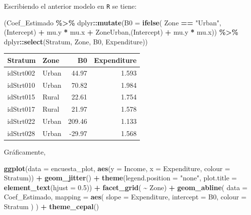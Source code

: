 \documentclass[
  spanish,
  12pt,
]{book}
\newenvironment{Shaded}{\begin{snugshade}}{\end{snugshade}}
\newcommand{\AttributeTok}[1]{\textcolor[rgb]{0.13,0.29,0.53}{#1}}
\newcommand{\FloatTok}[1]{\textcolor[rgb]{0.00,0.00,0.81}{#1}}
\newcommand{\FunctionTok}[1]{\textcolor[rgb]{0.13,0.29,0.53}{\textbf{#1}}}
\newcommand{\NormalTok}[1]{#1}
\newcommand{\SpecialCharTok}[1]{\textcolor[rgb]{0.81,0.36,0.00}{\textbf{#1}}}
\newcommand{\StringTok}[1]{\textcolor[rgb]{0.31,0.60,0.02}{#1}}
\begin{document}
Escribiendo el anterior modelo en \texttt{R} se tiene:

\begin{Shaded}
\begin{Highlighting}[]
\NormalTok{(Coef\_Estimado }\SpecialCharTok{\%\textgreater{}\%}\NormalTok{  dplyr}\SpecialCharTok{::}\FunctionTok{mutate}\NormalTok{(}\AttributeTok{B0 =} \FunctionTok{ifelse}\NormalTok{( Zone }\SpecialCharTok{==} \StringTok{"Urban"}\NormalTok{, }\StringTok{\textasciigrave{}}\AttributeTok{(Intercept)}\StringTok{\textasciigrave{}} \SpecialCharTok{+}\NormalTok{ mu.y }\SpecialCharTok{*}\NormalTok{ mu.x }\SpecialCharTok{+}\NormalTok{ ZoneUrban,}\StringTok{\textasciigrave{}}\AttributeTok{(Intercept)}\StringTok{\textasciigrave{}} \SpecialCharTok{+}\NormalTok{ mu.y }\SpecialCharTok{*}\NormalTok{ mu.x)) }\SpecialCharTok{\%\textgreater{}\%}
\NormalTok{  dplyr}\SpecialCharTok{::}\FunctionTok{select}\NormalTok{(Stratum, Zone, B0, Expenditure))}
\end{Highlighting}
\end{Shaded}

\begin{tabular}{l|l|r|r}
\hline
Stratum & Zone & B0 & Expenditure\\
\hline
idStrt002 & Urban & 44.97 & 1.593\\
\hline
idStrt010 & Urban & 70.82 & 1.984\\
\hline
idStrt015 & Rural & 22.61 & 1.754\\
\hline
idStrt017 & Rural & 21.97 & 1.578\\
\hline
idStrt022 & Urban & 209.46 & 1.133\\
\hline
idStrt028 & Urban & -29.97 & 1.568\\
\hline
\end{tabular}

Gráficamente,

\begin{Shaded}
\begin{Highlighting}[]
\FunctionTok{ggplot}\NormalTok{(}\AttributeTok{data =}\NormalTok{ encuesta\_plot,}
       \FunctionTok{aes}\NormalTok{(}\AttributeTok{y =}\NormalTok{ Income, }\AttributeTok{x =}\NormalTok{ Expenditure,}
           \AttributeTok{colour =}\NormalTok{ Stratum)) }\SpecialCharTok{+}
  \FunctionTok{geom\_jitter}\NormalTok{() }\SpecialCharTok{+}
  \FunctionTok{theme}\NormalTok{(}\AttributeTok{legend.position =} \StringTok{"none"}\NormalTok{,}
        \AttributeTok{plot.title =} \FunctionTok{element\_text}\NormalTok{(}\AttributeTok{hjust =} \FloatTok{0.5}\NormalTok{)) }\SpecialCharTok{+}
  \FunctionTok{facet\_grid}\NormalTok{( }\SpecialCharTok{\textasciitilde{}}\NormalTok{ Zone) }\SpecialCharTok{+}
  \FunctionTok{geom\_abline}\NormalTok{(}
    \AttributeTok{data =}\NormalTok{ Coef\_Estimado,}
    \AttributeTok{mapping =} \FunctionTok{aes}\NormalTok{(}
      \AttributeTok{slope =}\NormalTok{ Expenditure,}
      \AttributeTok{intercept =}\NormalTok{ B0,}
      \AttributeTok{colour =}\NormalTok{ Stratum}
\NormalTok{    )}
\NormalTok{  ) }\SpecialCharTok{+}
  \FunctionTok{theme\_cepal}\NormalTok{()}
\end{Highlighting}
\end{Shaded}
\end{document}
